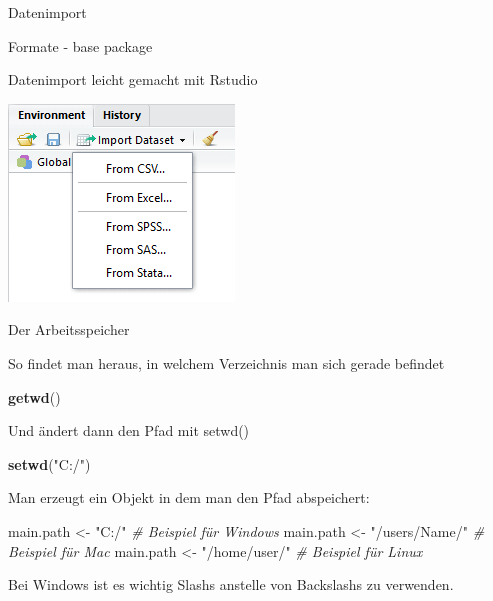 \documentclass[ignorenonframetext,]{beamer}
\newenvironment{Shaded}{}{}
\newcommand{\KeywordTok}[1]{\textcolor[rgb]{0.00,0.44,0.13}{\textbf{{#1}}}}
\newcommand{\StringTok}[1]{\textcolor[rgb]{0.25,0.44,0.63}{{#1}}}
\newcommand{\CommentTok}[1]{\textcolor[rgb]{0.38,0.63,0.69}{\textit{{#1}}}}
\newcommand{\NormalTok}[1]{{#1}}
\begin{document}
\begin{frame}[fragile]{Datenimport}
\begin{block}{Formate - base package}
\end{block}

\begin{block}{Datenimport leicht gemacht mit Rstudio}

\includegraphics{./tex2pdf.9796/746110b01ddf611ed8c07e15bb34f1ec7c4720f7.png}

\end{block}

\begin{block}{Der Arbeitsspeicher}

So findet man heraus, in welchem Verzeichnis man sich gerade befindet

\begin{Shaded}
\begin{Highlighting}[]
\KeywordTok{getwd}\NormalTok{()}
\end{Highlighting}
\end{Shaded}

Und ändert dann den Pfad mit setwd()

\begin{Shaded}
\begin{Highlighting}[]
\KeywordTok{setwd}\NormalTok{(}\StringTok{"C:/"}\NormalTok{)}
\end{Highlighting}
\end{Shaded}

Man erzeugt ein Objekt in dem man den Pfad abspeichert:

\begin{Shaded}
\begin{Highlighting}[]
\NormalTok{main.path <-}\StringTok{ "C:/"} \CommentTok{# Beispiel für Windows}
\NormalTok{main.path <-}\StringTok{ "/users/Name/"} \CommentTok{# Beispiel für Mac}
\NormalTok{main.path <-}\StringTok{ "/home/user/"} \CommentTok{# Beispiel für Linux}
\end{Highlighting}
\end{Shaded}

Bei Windows ist es wichtig Slashs anstelle von Backslashs zu verwenden.


\end{block}
\end{frame}
\end{document}
